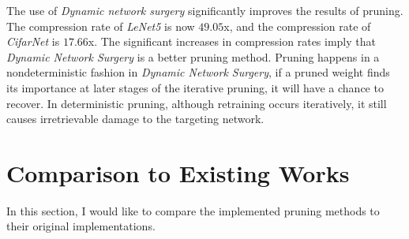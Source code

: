 \documentclass[a4paper,12pt]{report}
\begin{document}
The use of \textit{Dynamic network surgery} significantly improves the results of
pruning.
The compression rate of \textit{LeNet5} is now $49.05$x, and the compression
rate of \textit{CifarNet} is $17.66$x.
The significant increases in compression rates imply that \textit{Dynamic Network
Surgery} is a better pruning method.
Pruning happens in a nondeterministic fashion in \textit{Dynamic Network
Surgery}, if a pruned weight finds its importance at later stages of the
iterative pruning, it will have a chance to recover.
In deterministic
pruning, although retraining occurs iteratively, it still causes irretrievable damage to
the targeting network.

\section{Comparison to Existing Works}
\label{sec:pruning_ext_comp}
In this section, I would like to compare the implemented pruning methods to
their original implementations.
\end{document}
